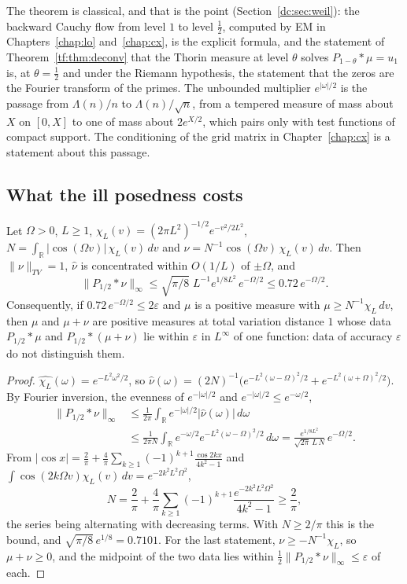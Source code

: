 The theorem is classical, and that is the point (Section~\ref{dc:sec:weil}): the backward Cauchy flow from level $1$ to level $\tfrac12$, computed by EM in Chapters~\ref{chap:lo} and~\ref{chap:cx}, is the explicit formula, and the statement of Theorem~\ref{tf:thm:deconv} that the Thorin measure at level $\theta$ solves $P_{1-\theta}*\mu=u_1$ is, at $\theta=\tfrac12$ and under the Riemann hypothesis, the statement that the zeros are the Fourier transform of the primes. The unbounded multiplier $e^{|\omega|/2}$ is the passage from $\Lambda(n)/n$ to $\Lambda(n)/\sqrt n$, from a tempered measure of mass about $X$ on $[0,X]$ to one of mass about $2e^{X/2}$, which pairs only with test functions of compact support. The conditioning of the grid matrix in Chapter~\ref{chap:cx} is a statement about this passage.

\subsection{What the ill posedness costs}

\begin{proposition}\label{es:prop:resolution}
Let $\Omega>0$, $L\ge1$, $\chi_L(v)=(2\pi L^2)^{-1/2}e^{-v^2/2L^2}$, $N=\int_{\mathbb R}|\cos(\Omega v)|\,\chi_L(v)\,dv$ and $\nu=N^{-1}\cos(\Omega v)\,\chi_L(v)\,dv$. Then $\|\nu\|_{TV}=1$, $\widehat\nu$ is concentrated within $O(1/L)$ of $\pm\Omega$, and
\[
\|P_{1/2}*\nu\|_\infty\le\sqrt{\pi/8}\;L^{-1}e^{1/8L^2}\,e^{-\Omega/2}\le0.72\,e^{-\Omega/2}.
\]
Consequently, if $0.72\,e^{-\Omega/2}\le2\varepsilon$ and $\mu$ is a positive measure with $\mu\ge N^{-1}\chi_L\,dv$, then $\mu$ and $\mu+\nu$ are positive measures at total variation distance $1$ whose data $P_{1/2}*\mu$ and $P_{1/2}*(\mu+\nu)$ lie within $\varepsilon$ in $L^\infty$ of one function: data of accuracy $\varepsilon$ do not distinguish them.
\end{proposition}

\begin{proof}
$\widehat{\chi_L}(\omega)=e^{-L^2\omega^2/2}$, so $\widehat\nu(\omega)=(2N)^{-1}\bigl(e^{-L^2(\omega-\Omega)^2/2}+e^{-L^2(\omega+\Omega)^2/2}\bigr)$. By Fourier inversion, the evenness of $e^{-|\omega|/2}$ and $e^{-|\omega|/2}\le e^{-\omega/2}$,
\[
\begin{split}\|P_{1/2}*\nu\|_\infty&\le\frac1{2\pi}\int_{\mathbb R}e^{-|\omega|/2}|\widehat\nu(\omega)|\,d\omega\\&\le\frac1{2\pi N}\int_{\mathbb R}e^{-\omega/2}e^{-L^2(\omega-\Omega)^2/2}\,d\omega=\frac{e^{1/8L^2}}{\sqrt{2\pi}\,L\,N}\,e^{-\Omega/2}.\end{split}
\]
From $|\cos x|=\frac2\pi+\frac4\pi\sum_{k\ge1}(-1)^{k+1}\frac{\cos2kx}{4k^2-1}$ and $\int\cos(2k\Omega v)\chi_L(v)\,dv=e^{-2k^2L^2\Omega^2}$,
\[
N=\frac2\pi+\frac4\pi\sum_{k\ge1}(-1)^{k+1}\frac{e^{-2k^2L^2\Omega^2}}{4k^2-1}\ge\frac2\pi,
\]
the series being alternating with decreasing terms. With $N\ge2/\pi$ this is the bound, and $\sqrt{\pi/8}\,e^{1/8}=0.7101$. For the last statement, $\nu\ge-N^{-1}\chi_L$, so $\mu+\nu\ge0$, and the midpoint of the two data lies within $\tfrac12\|P_{1/2}*\nu\|_\infty\le\varepsilon$ of each.
\end{proof}

